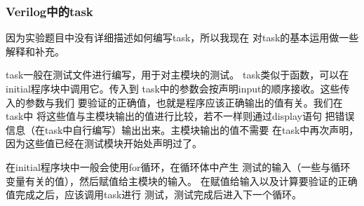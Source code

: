 \documentclass[12pt,a4paper,UTF8]{article}
\begin{document}
\subsubsection{Verilog中的task}

因为实验题目中没有详细描述如何编写task，所以我现在
对task的基本运用做一些解释和补充。

task一般在测试文件进行编写，用于对主模块的测试。
task类似于函数，可以在initial程序块中调用它。传入到
task中的参数会按声明input的顺序接收。这些传入的参数与我们
要验证的正确值，也就是程序应该正确输出的值有关。我们在task中
将这些值与主模块输出的值进行比较，若不一样则通过display语句
把错误信息（在task中自行编写）输出出来。主模块输出的值不需要
在task中再次声明，因为这些值已经在测试模块开始处声明过了。

在initial程序块中一般会使用for循环，在循环体中产生
测试的输入（一些与循环变量有关的值），然后赋值给主模块的输入。
在赋值给输入以及计算要验证的正确值完成之后，应该调用task进行
测试，测试完成后进入下一个循环。
\end{document}
